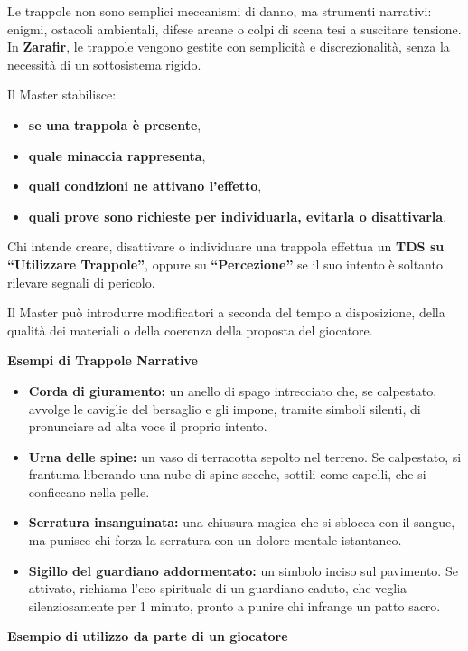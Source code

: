 \documentclass[../manuale_main.tex]{subfiles}
\begin{document}
Le trappole non sono semplici meccanismi di danno, ma strumenti narrativi: enigmi, ostacoli ambientali, difese arcane o colpi di scena tesi a suscitare tensione. In \textbf{Zarafir}, le trappole vengono gestite con semplicità e discrezionalità, senza la necessità di un sottosistema rigido.

Il Master stabilisce:
\begin{itemize}
\item \textbf{se una trappola è presente},
\item \textbf{quale minaccia rappresenta},
\item \textbf{quali condizioni ne attivano l’effetto},
\item \textbf{quali prove sono richieste per individuarla, evitarla o disattivarla}.
\end{itemize}

Chi intende creare, disattivare o individuare una trappola effettua un \textbf{TDS su ``Utilizzare Trappole''}, oppure su \textbf{``Percezione''} se il suo intento è soltanto rilevare segnali di pericolo.

Il Master può introdurre modificatori a seconda del tempo a disposizione, della qualità dei materiali o della coerenza della proposta del giocatore.

\vspace{0.4cm}
\noindent\textbf{Esempi di Trappole Narrative}

\begin{itemize}
\item \textbf{Corda di giuramento:} un anello di spago intrecciato che, se calpestato, avvolge le caviglie del bersaglio e gli impone, tramite simboli silenti, di pronunciare ad alta voce il proprio intento.
\item \textbf{Urna delle spine:} un vaso di terracotta sepolto nel terreno. Se calpestato, si frantuma liberando una nube di spine secche, sottili come capelli, che si conficcano nella pelle.
\item \textbf{Serratura insanguinata:} una chiusura magica che si sblocca con il sangue, ma punisce chi forza la serratura con un dolore mentale istantaneo.
\item \textbf{Sigillo del guardiano addormentato:} un simbolo inciso sul pavimento. Se attivato, richiama l’eco spirituale di un guardiano caduto, che veglia silenziosamente per 1 minuto, pronto a punire chi infrange un patto sacro.
\end{itemize}

\vspace{0.4cm}
\noindent\textbf{Esempio di utilizzo da parte di un giocatore}
\end{document}
